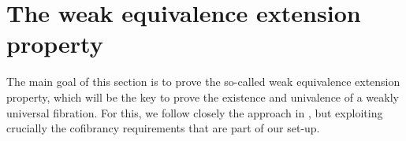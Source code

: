 \documentclass[reqno,10pt,a4paper,oneside,draft]{amsart}
\begin{document}
\medskip







 




\section{The weak equivalence extension property}
\label{sec:equep}

The main goal of this section is to prove the so-called weak equivalence extension property, which will be the key to prove the existence and univalence of a weakly universal fibration.  For this, we follow closely the approach in \cite{voevodsky-simplicial-model}, but exploiting crucially the cofibrancy requirements that are part of our set-up.
\end{document}

